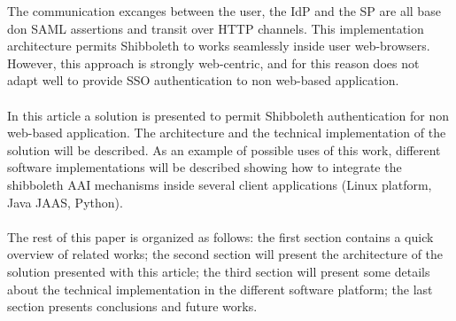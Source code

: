 The communication excanges between the user, the IdP and the SP are all base don SAML assertions and transit over HTTP channels.
This implementation architecture permits Shibboleth to works seamlessly inside user web-browsers.
However, this approach is strongly web-centric, and for this reason does not adapt well to provide SSO authentication to non web-based application.\\
\\
In this article a solution is presented to permit Shibboleth authentication for non web-based application.
The architecture and the technical implementation of the solution will be described.
As an example of possible uses of this work, different software implementations will be described showing how to integrate the shibboleth AAI mechanisms inside several
client applications (Linux platform, Java JAAS, Python).\\
\\
The rest of this paper is organized as follows: the first section contains a quick overview of related works; the second section will present the architecture of
the solution presented with this article; the third section will present some details about the technical implementation in the different software platform; the last
section presents conclusions and future works.

\label{sec:relatedworks}
